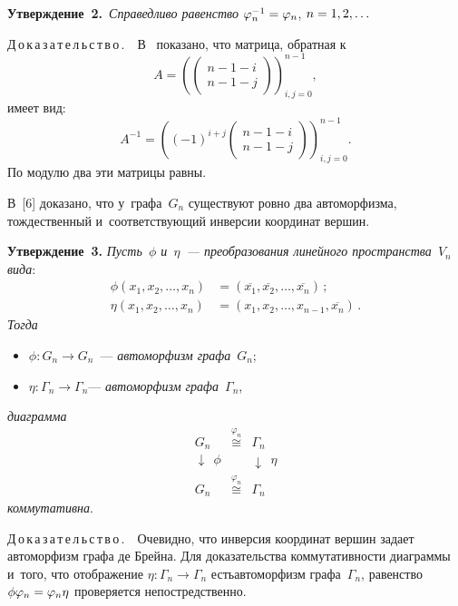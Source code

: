 \begin{multicols}{2}
  \noindent
  \textbf{Утверждение~2.}\ \textit{Справедливо равенство} $\varphi_n^{-
1}\hm=\varphi_n$, $n\hm=1,2,\ldots$
  
  \smallskip
  
  \noindent
  Д\,о\,к\,а\,з\,а\,т\,е\,л\,ь\,с\,т\,в\,о\,.\ \  
В~\cite[п.~2.2]{5-mel} показано, что мат\-ри\-ца, обратная к
  $$
  A=\displaystyle \left( \begin{pmatrix} n-1-i\\  
n-1-j\end{pmatrix}\right)_{i,j=0}^{n-1},
$$
 имеет вид: 
 $$
 A^{-1}= 
\displaystyle\left( (-1)^{i+j}\begin{pmatrix} n-1-i\\ n-1-
j\end{pmatrix}\right)_{i,j=0}^{n-1}.
$$
 По модулю два эти матрицы равны.
  
  В~[6] доказано, что у~графа~$G_n$ существуют ровно два автоморфизма, 
тождественный и~соответствующий инверсии координат вершин.
  
  \smallskip
  
  \noindent
  \textbf{Утверждение~3.} \textit{Пусть~$\phi$ и~$\eta$~--- преобразования 
линейного пространства~$V_n$ вида}:
  \begin{align*}
  \phi\left(x_1,x_2,\ldots , x_n\right)&= 
  \left( \overline{x_1},\overline{x_2},\ldots , \overline{x_n}\right)\,;\\
  \eta\left(x_1,x_2,\ldots , x_n\right) &= \left( x_1, x_2,\ldots ,  
x_{n-1}, \overline{x_n}\right)\,.
  \end{align*}
\textit{Тогда} 
\begin{itemize}
\item[\,] $\phi: G_n\to G_n$~--- \textit{автоморфизм графа}~$G_n$;
\item[\,] $\eta: \Gamma_n\to\Gamma_n$--- \textit{автоморфизм 
графа}~$\Gamma_n$,
\end{itemize}
\textit{диаграмма} 
$$
\begin{array}{ccc}
G_n&\overset{\varphi_n}{\cong}&\Gamma_n\\[3pt]
\downarrow\ \ \phi & & \downarrow\ \ \eta\\[3pt]
G_n & \overset{\varphi_n}{\cong}&\Gamma_n
\end{array}
$$
\textit{коммутативна}.
  
  \smallskip
  
  \noindent
  Д\,о\,к\,а\,з\,а\,т\,е\,л\,ь\,с\,т\,в\,о\,.\ \ Очевидно, что инверсия координат 
вершин задает автоморфизм графа де Брейна. Для доказательства 
коммутативности диаграммы и~того, что отображение $\eta: \Gamma_n\to 
\Gamma_n$ есть\linebreak автоморфизм графа~$\Gamma_n$, равенство 
$\phi\varphi_n\hm=\varphi_n\eta$ проверяется непостредственно. 
  

\end{multicols}
